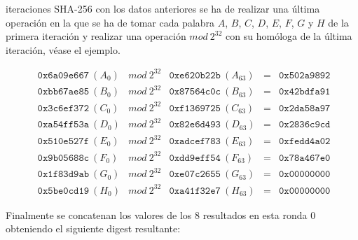 \documentclass{article}
\begin{document}
        \vspace{1.3mm}
        
         iteraciones SHA-256 con los datos anteriores se ha de realizar una última operación en la que se ha de tomar cada palabra $A$, $B$, $C$, $D$, $E$, $F$, $G$ y $H$ de la primera iteración y realizar una operación $mod\ 2^{32}$ con su homóloga de la última iteración, véase el ejemplo.
        
        \begin{figure}[H]
        \centering
            $\begin{array}{lllll}
                \texttt{0x6a09e667}\ (A_{0}) & mod\ 2^{32} & \texttt{0xe620b22b}\ (A_{63}) & = & \texttt{0x502a9892} \\
                \texttt{0xbb67ae85}\ (B_{0}) & mod\ 2^{32} & \texttt{0x87564c0c}\ (B_{63}) & = & \texttt{0x42bdfa91} \\
                \texttt{0x3c6ef372}\ (C_{0}) & mod\ 2^{32} & \texttt{0xf1369725}\ (C_{63}) & = & \texttt{0x2da58a97} \\
                \texttt{0xa54ff53a}\ (D_{0}) & mod\ 2^{32} & \texttt{0x82e6d493}\ (D_{63}) & = & \texttt{0x2836c9cd} \\
                \texttt{0x510e527f}\ (E_{0}) & mod\ 2^{32} & \texttt{0xadcef783}\ (E_{63}) & = & \texttt{0xfedd4a02} \\
                \texttt{0x9b05688c}\ (F_{0}) & mod\ 2^{32} & \texttt{0xdd9eff54}\ (F_{63}) & = & \texttt{0x78a467e0} \\
                \texttt{0x1f83d9ab}\ (G_{0}) & mod\ 2^{32} & \texttt{0xe07c2655}\ (G_{63}) & = & \texttt{0x00000000} \\
                \texttt{0x5be0cd19}\ (H_{0}) & mod\ 2^{32} & \texttt{0xa41f32e7}\ (H_{63}) & = & \texttt{0x00000000}
            \end{array}$
        \end{figure}
        
        Finalmente se concatenan los valores de los 8 resultados en esta ronda 0 obteniendo el siguiente digest resultante:
        
\end{document}

